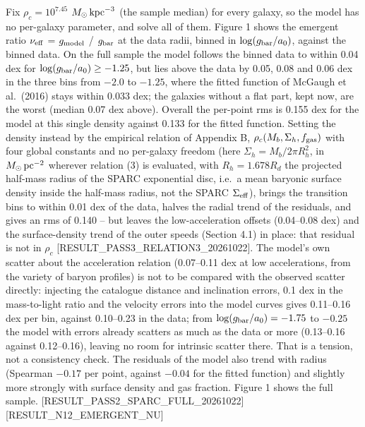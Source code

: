 \documentclass[
  10pt,
]{article}
\begin{document}
Fix $\rho_c=10^{7.45}$ $M_\odot\,{\rm kpc}^{-3}$ (the sample median) for every
galaxy, so the model has no per-galaxy parameter, and solve all of them.
Figure 1 shows the emergent ratio $\nu_{\rm eff}$ = $g_{\rm model}$ / $g_{\rm bar}$ at the
data radii, binned in $\log(g_{\rm bar}/a_0)$, against the binned data. On the full sample the model follows the binned data to within 0.04 dex for $\log(g_{\rm bar}/a_0)\ge-1.25$, but lies above the data by 0.05, 0.08 and 0.06 dex in the three bins from $-2.0$ to $-1.25$, where the fitted function of McGaugh et al.~(2016) stays within 0.033 dex; the galaxies without a flat part, kept now, are the worst (median 0.07 dex above). Overall the per-point rms is 0.155 dex for the model at this single density against 0.133 for the fitted function. Setting the density instead by the empirical relation of Appendix B, $\rho_c(M_b,\Sigma_h,f_{\rm gas})$ with four global constants and no per-galaxy freedom (here $\Sigma_h=M_b/2\pi R_h^2$, in $M_\odot\,{\rm pc}^{-2}$ wherever relation (3) is evaluated, with $R_h=1.678R_d$ the projected half-mass radius of the SPARC exponential disc, i.e.\ a mean baryonic surface density inside the half-mass radius, not the SPARC $\Sigma_{\rm eff}$), brings the transition bins to within 0.01 dex of the data, halves the radial trend of the residuals, and gives an rms of 0.140 -- but leaves the low-acceleration offsets (0.04--0.08 dex) and the surface-density trend of the outer speeds (Section 4.1) in place: that residual is not in $\rho_c$ {[}RESULT\_PASS3\_RELATION3\_20261022{]}. The model's own scatter about the acceleration relation (0.07--0.11 dex at low accelerations, from the variety of baryon profiles) is not to be compared with the observed scatter directly: injecting the catalogue distance and inclination errors, 0.1 dex in the mass-to-light ratio and the velocity errors into the model curves gives 0.11--0.16 dex per bin, against 0.10--0.23 in the data; from $\log(g_{\rm bar}/a_0)=-1.75$ to $-0.25$ the model with errors already scatters as much as the data or more (0.13--0.16 against 0.12--0.16), leaving no room for intrinsic scatter there. That is a tension, not a consistency check. The residuals of the model also trend with radius (Spearman $-0.17$ per point, against $-0.04$ for the fitted function) and slightly more strongly with surface density and gas fraction. Figure 1 shows the full sample. {[}RESULT\_PASS2\_SPARC\_FULL\_20261022{]} {[}RESULT\_N12\_EMERGENT\_NU{]}
\end{document}
